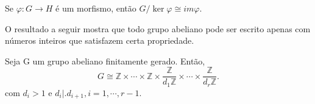 \documentclass[algebra_notes.tex]{subfiles}
\begin{document}
\begin{crl*}
	Se $\varphi:G\rightarrow H$ é um morfismo, então $G/\ker{\varphi}\cong im\varphi.$
\end{crl*}

O resultado a seguir mostra que todo grupo abeliano pode ser escrito apenas com números inteiros que satisfazem certa propriedade.
\begin{theorem*}
	Seja G um grupo abeliano finitamente gerado. Então,
	$$
		G\cong{} \mathbb{Z}\times \cdots\times \mathbb{Z}\times \frac{\mathbb{Z}}{d_{1}\mathbb{Z}}\times \cdots\times \frac{\mathbb{Z}}{d_{r} \mathbb{Z}}.
	$$
	com $d_{i} > 1$ e $d_{i}\bigl|\bigr. d_{i+1}, i=1,\cdots,r-1.$
\end{theorem*}
\end{document}
